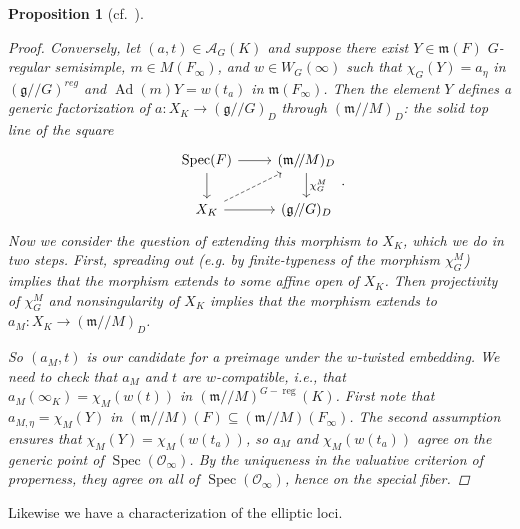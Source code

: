 \documentclass[openany]{amsbook}
\newtheorem{proposition}[theorem]{Proposition}
\theoremstyle{definition}
\theoremstyle{remark}
\numberwithin{equation}{section}
\renewcommand{\O}{\mathcal{O}}
\newcommand{\cA}{\mathcal{A}}
\newcommand{\m}{\mathfrak{m}}
\renewcommand{\-}{\operatorname{-}}
\newcommand{\Spec}{\operatorname{Spec}}
\renewcommand{\m}{\mathfrak{m}}
\newcommand{\g}{\mathfrak{g}}
\newcommand{\on}[1]{\operatorname{#1}}
\newcommand{\reg}{\on{reg}}
\newcommand{\gitq}{/\!/}
\begin{document}
\begin{proposition}[{{{cf.\ \cite[Proposition 3.9.1]{CLI}}}}]
\begin{proof}
Conversely, let $(a,t) \in \cA_G(K)$ and suppose there exist $Y \in \m(F)$ $G$-regular semisimple, $m \in M(F_{\infty})$, and $w \in W_G(\infty)$ such that $\chi_G(Y) = a_{\eta}$ in $(\g\gitq G)^{reg}$ and $\on{Ad}(m)Y = w(t_a)$ in $\m(F_{\infty})$. Then the element $Y$ defines a generic factorization of $a : X_K \to (\g\gitq G)_D$ through $(\m\gitq M)_D$: the solid top line of the square
\[
        \begin{tikzcd}[ampersand replacement=\&]
            \Spec(F) \ar[r] \ar[d] \& (\m\gitq M)_D \ar[d, "\chi_G^M"]\\
            X_K \ar[r] \ar[ur, dashed] \& (\g\gitq G)_D
        \end{tikzcd}.
\]
Now we consider the question of extending this morphism to $X_K$, which we do in two steps. First, spreading out (e.g. by finite-typeness of the morphism $\chi_G^M$) implies that the morphism extends to some affine open of $X_K$. Then projectivity of $\chi_G^M$ and nonsingularity of $X_K$ implies that the morphism extends to $a_M : X_K \to (\m\gitq M)_D$. 

So $(a_M, t)$ is our candidate for a preimage under the $w$-twisted embedding. We need to check that $a_M$ and $t$ are $w$-compatible, i.e., that $a_M(\infty_K) = \chi_M(w(t))$ in $(\m\gitq M)^{G-\reg}(K)$. First note that $a_{M,\eta} = \chi_M(Y)$ in $(\m\gitq M)(F) \subseteq (\m\gitq M)(F_\infty)$. The second assumption ensures that $\chi_M(Y) = \chi_M(w(t_a))$, so $a_M$ and $\chi_M(w(t_a))$ agree on the generic point of $\Spec(\O_{\infty})$. By the uniqueness in the valuative criterion of properness, they agree on all of $\Spec(\O_{\infty})$, hence on the special fiber. 
\end{proof}
\end{proposition}

Likewise we have a characterization of the elliptic loci.
\end{document}
